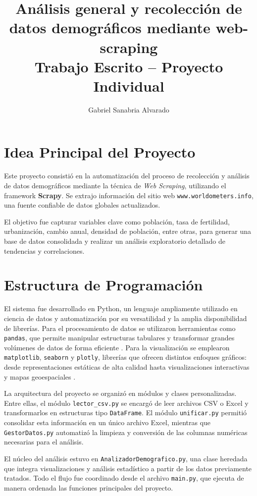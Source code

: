 \documentclass[12pt]{article}
\title{\textbf{Análisis general y recolección de datos demográficos mediante 
web-scraping}\\\large Trabajo Escrito – Proyecto Individual}
\author{Gabriel Sanabria Alvarado}
\date{}
\begin{document}
\maketitle

\section{Idea Principal del Proyecto}

Este proyecto consistió en la automatización del proceso de recolección y análisis de datos demográficos mediante la técnica de \textit{Web Scraping}, utilizando el framework \textbf{Scrapy}. Se extrajo información del sitio web \texttt{www.worldometers.info}, una fuente confiable de datos globales actualizados.

El objetivo fue capturar variables clave como población, tasa de fertilidad, urbanización, cambio anual, densidad de población, entre otras, para generar una base de datos consolidada y realizar un análisis exploratorio detallado de tendencias y correlaciones.

\section{Estructura de Programación}


El sistema fue desarrollado en Python, un lenguaje ampliamente utilizado en ciencia de datos y automatización por su versatilidad y la amplia disponibilidad de librerías. Para el procesamiento de datos se utilizaron herramientas como \texttt{pandas}, que permite manipular estructuras tabulares y transformar grandes volúmenes de datos de forma eficiente \parencite{mckinney2010}. Para la visualización se emplearon \texttt{matplotlib}, \texttt{seaborn} y \texttt{plotly}, librerías que ofrecen distintos enfoques gráficos: desde representaciones estáticas de alta calidad hasta visualizaciones interactivas y mapas geoespaciales \parencite{hunter2007, waskom2021, plotlydocs}.

La arquitectura del proyecto se organizó en módulos y clases personalizadas. Entre ellas, el módulo \texttt{lector\_csv.py} se encargó de leer archivos CSV o Excel y transformarlos en estructuras tipo \texttt{DataFrame}. El módulo \texttt{unificar.py} permitió consolidar esta información en un único archivo Excel, mientras que \texttt{GestorDatos.py} automatizó la limpieza y conversión de las columnas numéricas necesarias para el análisis.

El núcleo del análisis estuvo en \texttt{AnalizadorDemografico.py}, una clase heredada que integra visualizaciones y análisis estadístico a partir de los datos previamente tratados. Todo el flujo fue coordinado desde el archivo \texttt{main.py}, que ejecuta de manera ordenada las funciones principales del proyecto.
\end{document}
